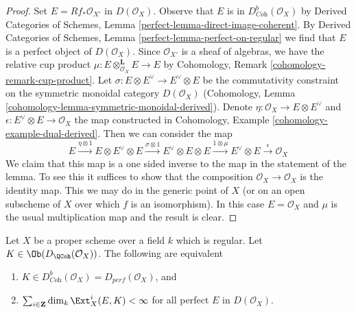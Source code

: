 \begin{proof}
Set $E = Rf_*\mathcal{O}_{X'}$ in $D(\mathcal{O}_X)$.
Observe that $E$ is in $D^b_{\textit{Coh}}(\mathcal{O}_X)$ by
Derived Categories of Schemes, Lemma \ref{perfect-lemma-direct-image-coherent}.
By 
Derived Categories of Schemes, Lemma \ref{perfect-lemma-perfect-on-regular}
we find that $E$ is a perfect object of $D(\mathcal{O}_X)$.
Since $\mathcal{O}_{X'}$ is a sheaf of algebras, we have the
relative cup product $\mu : E \otimes_{\mathcal{O}_X}^\mathbf{L} E \to E$
by Cohomology, Remark \ref{cohomology-remark-cup-product}.
Let $\sigma : E \otimes E^\vee \to E^\vee \otimes E$ be the commutativity
constraint on the symmetric monoidal category $D(\mathcal{O}_X)$
(Cohomology, Lemma \ref{cohomology-lemma-symmetric-monoidal-derived}).
Denote $\eta : \mathcal{O}_X \to E \otimes E^\vee$ and
$\epsilon : E^\vee \otimes E \to \mathcal{O}_X$ the map
constructed in Cohomology, Example \ref{cohomology-example-dual-derived}.
Then we can consider the map
$$
E \xrightarrow{\eta \otimes 1} E \otimes E^\vee \otimes E
\xrightarrow{\sigma \otimes 1} E^\vee \otimes E \otimes E
\xrightarrow{1 \otimes \mu} E^\vee \otimes E
\xrightarrow{\epsilon} \mathcal{O}_X
$$
We claim that this map is a one sided inverse to the map in the
statement of the lemma. To see this it suffices to show that
the composition $\mathcal{O}_X \to \mathcal{O}_X$ is the identity
map. This we may do in the generic point of $X$ (or on an open
subscheme of $X$ over which $f$ is an isomorphism). In this
case $E = \mathcal{O}_X$ and $\mu$ is the usual multiplication map
and the result is clear.
\end{proof}

\begin{lemma}
\label{lemma-characterize-dbcoh-proper-regular}
Let $X$ be a proper scheme over a field $k$ which is regular. Let
$K \in \Ob(D_\QCoh(\mathcal{O}_X))$. The following are equivalent
\begin{enumerate}
\item $K \in D^b_{\textit{Coh}}(\mathcal{O}_X) = D_{perf}(\mathcal{O}_X)$, and
\item $\sum_{i \in \mathbf{Z}} \dim_k \Ext^i_X(E, K) < \infty$
for all perfect $E$ in $D(\mathcal{O}_X)$.
\end{enumerate}
\end{lemma}


